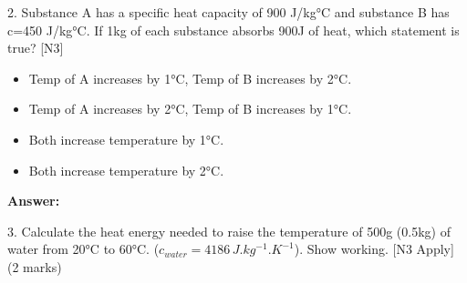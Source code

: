 \documentclass[11pt, a4paper]{article}
\begin{document}
2.  Substance A has a specific heat capacity of 900 J/kg°C and substance B has c=450 J/kg°C. If 1kg of each substance absorbs 900J of heat, which statement is true? [N3]
    \begin{itemize}
        \item[A.] Temp of A increases by 1°C, Temp of B increases by 2°C.
        \item[B.] Temp of A increases by 2°C, Temp of B increases by 1°C.
        \item[C.] Both increase temperature by 1°C.
        \item[D.] Both increase temperature by 2°C.
    \end{itemize}
    \textbf{Answer:} \underline{\hspace{1cm}}

3.  Calculate the heat energy needed to raise the temperature of 500g (0.5kg) of water from 20\si{\celsius} to 60\si{\celsius}. ($c_{water} = 4186 \, \si{J.kg^{-1}.K^{-1}}$). Show working. [N3 Apply] (2 marks)
    \vspace{3cm}
\end{document}
